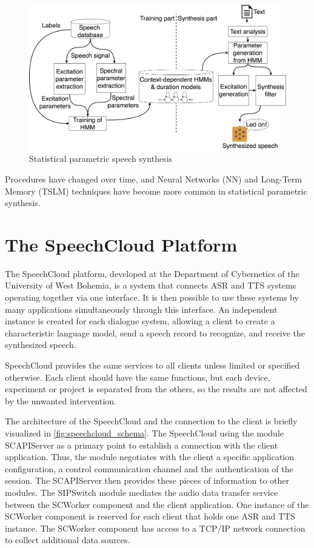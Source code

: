 \begin{figure}[H]
    \centering
    \includegraphics[width=\textwidth]{img/synthesis_model.png}
    \caption{Statistical parametric speech synthesis \citep{statistical_parametric_speech_synthesis_ZEN20091039}}
    \label{fig:synthesis_model}
\end{figure}

Procedures have changed over time, and Neural Networks (NN) and Long-Term Memory (TSLM) techniques have become more common in statistical parametric synthesis.

\section{The SpeechCloud Platform}

The SpeechCloud platform, developed at the Department of Cybernetics of the University of West Bohemia, is a system that connects ASR and TTS systems operating together via one interface. It is then possible to use these systems by many applications simultaneously through this interface. An independent instance is created for each dialogue system, allowing a client to create a characteristic language model, send a speech record to recognize, and receive the synthesized speech.

SpeechCloud provides the same services to all clients unless limited or specified otherwise. Each client should have the same functions, but each device, experiment or project is separated from the others, so the results are not affected by the unwanted intervention.

The architecture of the SpeechCloud and the connection to the client is briefly visualized in \cref{fig:speechcloud_schema}. The SpeechCloud using the module SCAPIServer as a primary point to establish a connection with the client application. Thus, the module negotiates with the client a specific application configuration, a control communication channel and the authentication of the session. The SCAPIServer then provides these pieces of information to other modules. The SIPSwitch module mediates the audio data transfer service between the SCWorker component and the client application. One instance of the SCWorker component is reserved for each client that holds one ASR and TTS instance. The SCWorker component has access to a TCP/IP network connection to collect additional data sources.


